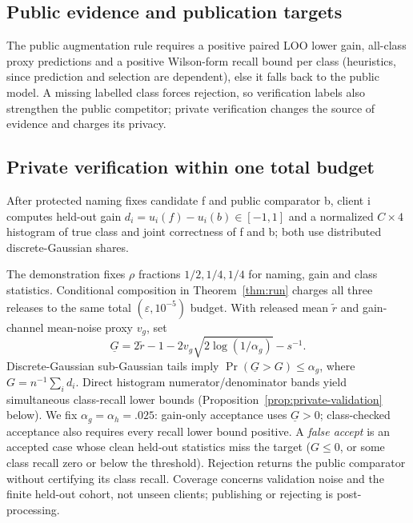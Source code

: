 \subsection{Public evidence and publication targets}

The public augmentation rule requires a positive paired LOO lower gain,
all-class proxy predictions and a positive Wilson-form recall bound per class
(heuristics, since prediction and selection are dependent), else it falls
back to the public model. A missing labelled class forces rejection, so
verification labels also strengthen the public competitor; private
verification changes the source of evidence and charges its privacy.

\subsection{Private verification within one total budget}
\label{sec:private-verification}

After protected naming fixes candidate f and public comparator b, client i
computes held-out gain $d_i=u_i(f)-u_i(b)\in[-1,1]$ and a normalized
$C\times4$ histogram of true class and joint correctness of f and b; both
use distributed discrete-Gaussian shares.

The demonstration fixes $\rho$ fractions $1/2,1/4,1/4$ for naming, gain and
class statistics. Conditional composition in Theorem~\ref{thm:run} charges
all three releases to the same total $(\varepsilon,10^{-5})$ budget.
With released mean $\tilde r$ and gain-channel mean-noise proxy $v_g$, set
\begin{equation}
\underline G=2\tilde r-1
-2v_g\sqrt{2\log(1/\alpha_g)}-s^{-1}.
\label{eq:private-gain-bound}
\end{equation}
Discrete-Gaussian sub-Gaussian tails \cite{canonne2020discrete} imply
$\Pr(\underline G>G)\le\alpha_g$, where $G=n^{-1}\sum_i d_i$.
Direct histogram numerator/denominator bands yield simultaneous class-recall lower
bounds (Proposition~\ref{prop:private-validation} below). We fix
$\alpha_g=\alpha_h=.025$: gain-only acceptance uses $\underline G>0$;
class-checked acceptance also requires every recall lower bound positive. A
\emph{false accept} is an accepted case whose clean held-out statistics miss
the target ($G\le0$, or some class recall zero or below the threshold).
Rejection returns the public comparator without certifying its class
recall. Coverage concerns validation noise and the finite held-out cohort,
not unseen clients; publishing or rejecting is post-processing.


